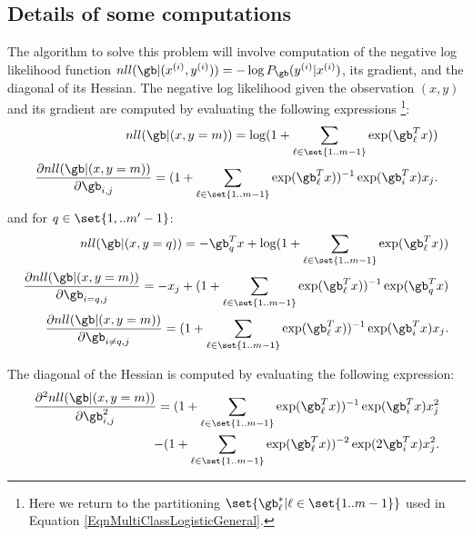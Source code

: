 \documentclass{article}
\begin{document}
\subsection{Details of some computations}
The algorithm to solve this problem will involve computation of the negative log likelihood function $nll(\gb|(x^{(i)}, y^{(i)})) = -\log P_\gb(y^{(i)}|x^{(i)})$, its gradient, and the diagonal of its Hessian. The negative log likelihood given the observation $(x, y)$ and its gradient are computed by evaluating the following expressions \footnote{Here we return to the partitioning $\set{\gb^{*}_\ell|\ell \in \set{1 .. m-1}}$ used in Equation \ref{EqnMultiClassLogisticGeneral}.}:
\begin{equation*}
\begin{split}
nll(\gb|(x, y=m)) = \log(1+\sum_{\ell\in \set{1 .. m-1}}\exp(\gb_\ell^Tx))\\ 
\frac{\partial nll(\gb|(x, y=m))}{\partial \gb_{i, j}} = (1+\sum_{\ell\in \set{1 .. m-1}}\exp(\gb_\ell^Tx))^{-1}\exp(\gb_i^Tx)x_j.\\
\end{split}
\end{equation*}
and for $q\in \set{1, .. m'-1}$:
\begin{equation*}
\begin{split}
nll(\gb|(x, y = q)) = -\gb_q^Tx + \log(1+\sum_{\ell\in \set{1 .. m-1}}\exp(\gb_\ell^Tx))\\
\frac{\partial nll(\gb|(x, y=m))}{\partial \gb_{i=q, j}} = -x_j + (1+\sum_{\ell\in \set{1 .. m-1}}\exp(\gb_\ell^Tx))^{-1}\exp(\gb_q^Tx)\\
\frac{\partial nll(\gb|(x, y=m))}{\partial \gb_{i\neq q, j}} = (1+\sum_{\ell\in \set{1 .. m-1}}\exp(\gb_\ell^Tx))^{-1}\exp(\gb_i^Tx)x_j.\\
\end{split}
\end{equation*}

The diagonal of the Hessian is computed by evaluating the following expression:
\begin{equation*}
\begin{split}
\frac{\partial^{2} nll(\gb|(x, y=m))}{\partial \gb_{i, j}^{2}} = (1+\sum_{\ell\in \set{1 .. m-1}}\exp(\gb_\ell^Tx))^{-1}\exp(\gb_i^Tx)x_j^{2} \\
- (1+\sum_{\ell\in \set{1 .. m-1}}\exp(\gb_\ell^Tx))^{-2}\exp(2\gb_i^Tx)x_j^{2}.\\
\end{split}
\end{equation*}
\end{document}

